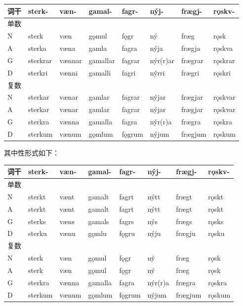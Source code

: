 \begin{longtable}{llllllll}
  \toprule
  词干 & sterk-   & væn-   & gamal-   & fagr-  & nýj-     & frægj-  & rǫskv-  \\
  \midrule
  \endhead
  \bottomrule
  \endfoot
  单数 &          &        &          &        &          &         &         \\
  N  & sterk    & væn    & gǫmul    & fǫgr   & ný       & fræg    & rǫsk    \\
  A  & sterka   & væna   & gamla    & fagra  & nýja     & frægja  & rǫskva  \\
  G  & sterkrar & vænnar & gamallar & fagrar & nýr(r)ar & frægrar &
  rǫskrar                                                                   \\
  D  & sterkri  & vænni  & gamalli  & fagri  & nýrri    & frægri  & rǫskri  \\
  复数 &          &        &          &        &          &         &         \\
  N  & sterkar  & vænar  & gamlar   & fagrar & nýjar    & frægjar & rǫskvar \\
  A  & sterkar  & vænar  & gamlar   & fagrar & nýjar    & frægjar & rǫskvar \\
  G  & sterkra  & vænna  & gamalla  & fagra  & nýr(r)a  & frægra  & rǫskra  \\
  D  & sterkum  & vænum  & gǫmlum   & fǫgrum & nýjum    & frægjum & rǫskum  \\
\end{longtable}

其中性形式如下：

\begin{longtable}{llllllll}
  \toprule
  词干 & sterk-  & væn-  & gamal-  & fagr-  & nýj-    & frægj-  & rǫskv- \\
  \midrule
  \endhead
  \bottomrule
  \endfoot
  单数 &         &       &         &        &         &         &        \\
  N  & sterkt  & vænt  & gamalt  & fagrt  & nýtt    & frægt   & rǫskt  \\
  A  & sterkt  & vænt  & gamalt  & fagrt  & nýtt    & frægt   & rǫskt  \\
  G  & sterks  & væns  & gamals  & fagrs  & nýs     & frægs   & rǫsks  \\
  D  & sterku  & vænu  & gǫmlu   & fǫgru  & nýju    & frægju  & rǫsku  \\
  复数 &         &       &         &        &         &         &        \\
  N  & sterk   & væn   & gǫmul   & fǫgr   & ný      & fræg    & rǫsk   \\
  A  & sterk   & væn   & gǫmul   & fǫgr   & ný      & fræg    & rǫsk   \\
  G  & sterkra & vænna & gamalla & fagra  & nýr(r)a & frægra  & rǫskra \\
  D  & sterkum & vænum & gǫmlum  & fǫgrum & nýjum   & frægjum & rǫskum \\
\end{longtable}

